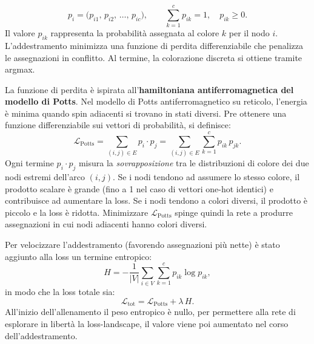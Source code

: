\documentclass{article}
\begin{document}
\begin{equation}
    p_i = \bigl(p_{i1},\, p_{i2},\, \dots,\, p_{ic}\bigr), \qquad
    \sum_{k=1}^c p_{ik} = 1, \quad p_{ik} \geq 0.
\end{equation}
Il valore $p_{ik}$ rappresenta la probabilità assegnata al colore $k$
per il nodo $i$. 
L'addestramento minimizza una funzione di perdita differenziabile che
penalizza le assegnazioni in conflitto. Al termine, la colorazione discreta si ottiene
tramite argmax.

La funzione di perdita è ispirata all'\textbf{hamiltoniana antiferromagnetica del modello
di Potts}. Nel modello di Potts antiferromagnetico su reticolo, l'energia è minima quando
spin adiacenti si trovano in stati diversi. Pre ottenere una funzione differenziabile sui vettori di probabilità, si definisce:
\begin{equation}
    \mathcal{L}_{\mathrm{Potts}} = \sum_{(i,j)\in E} p_i \cdot p_j
    = \sum_{(i,j)\in E} \sum_{k=1}^c p_{ik}\, p_{jk}.
\end{equation}
Ogni termine $p_i \cdot p_j$ misura la \emph{sovrapposizione} tra le distribuzioni di
colore dei due nodi estremi dell'arco $(i,j)$. Se i nodi tendono ad assumere lo stesso
colore, il prodotto scalare è grande (fino a 1 nel caso di vettori one-hot identici) e
contribuisce ad aumentare la loss. Se i nodi tendono a colori diversi, il prodotto è
piccolo e la loss è ridotta. Minimizzare $\mathcal{L}_{\mathrm{Potts}}$ spinge quindi la
rete a produrre assegnazioni in cui nodi adiacenti hanno colori diversi.



Per velocizzare l'addestramento (favorendo assegnazioni più nette) è stato aggiunto alla loss un termine entropico:
\begin{equation}
    H = -\frac{1}{|V|} \sum_{i \in V} \sum_{k=1}^c p_{ik} \log p_{ik},
\end{equation}
in modo che la loss totale sia:
\begin{equation}
    \mathcal{L}_{\mathrm{tot}} = \mathcal{L}_{\mathrm{Potts}} + \lambda\, H.
\end{equation}
All'inizio dell'allenamento il peso entropico è nullo, per permettere alla rete di esplorare in libertà la loss-landscape, il valore viene poi aumentato nel corso dell'addestramento.
\end{document}
